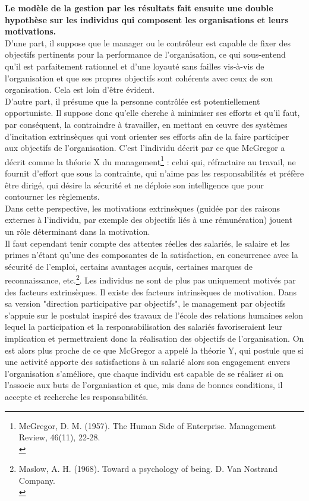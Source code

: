 \documentclass{tufte-handout}
\begin{document}
\begin{enumerate}
\textbf{Le modèle de la gestion par les résultats fait ensuite une double hypothèse sur les individus qui composent les organisations et leurs motivations.}\\
D’une part, il suppose que le manager ou le contrôleur est capable de fixer des objectifs pertinents pour la performance de l’organisation, ce qui sous-entend qu'il est parfaitement rationnel et d’une loyauté sans failles vis-à-vis de l’organisation et que ses propres objectifs sont cohérents avec ceux de son organisation. Cela est loin d’être évident.\\
D’autre part, il présume que la personne contrôlée est potentiellement opportuniste. Il suppose donc qu’elle cherche à minimiser ses efforts et qu’il faut, par conséquent, la contraindre à travailler, en mettant en œuvre des systèmes d’incitation extrinsèques qui vont orienter ses efforts afin de la faire participer aux objectifs de l’organisation. C’est l’individu décrit par ce que McGregor a décrit comme la théorie X du management\footnote{McGregor, D. M. (1957). The Human Side of Enterprise. Management Review, 46(11), 22‑28.\\} : celui qui, réfractaire au travail, ne fournit d’effort que sous la contrainte, qui n’aime pas les responsabilités et préfère être dirigé, qui désire la sécurité et ne déploie son intelligence que pour contourner les règlements.\\
Dans cette perspective, les motivations extrinsèques (guidée par des raisons externes à l’individu, par exemple des objectifs liés à une rémunération) jouent un rôle déterminant dans la motivation.\\
Il faut cependant tenir compte des attentes réelles des salariés, le salaire et les primes n’étant qu’une des composantes de la satisfaction, en concurrence avec la sécurité de l’emploi, certains avantages acquis, certaines marques de reconnaissance, etc.\footnote{Maslow, A. H. (1968). Toward a psychology of being. D. Van Nostrand Company.\\}. Les individus ne sont de plus pas uniquement motivés par des facteurs extrinsèques. Il existe des facteurs intrinsèques de motivation. Dans sa version "direction participative par objectifs",  le management par objectifs s’appuie sur le postulat inspiré des travaux de l’école des relations humaines selon lequel la participation et la responsabilisation des salariés favoriseraient leur implication et permettraient donc la réalisation des objectifs de l’organisation. On est alors plus proche de ce que McGregor a appelé la théorie Y, qui postule que si une activité apporte des satisfactions à un salarié alors son engagement envers l'organisation s'améliore, que chaque individu est capable de se réaliser si on l'associe aux buts de l'organisation et que, mis dans de bonnes conditions, il accepte et recherche les responsabilités.\\


\end{enumerate}
\end{document}
